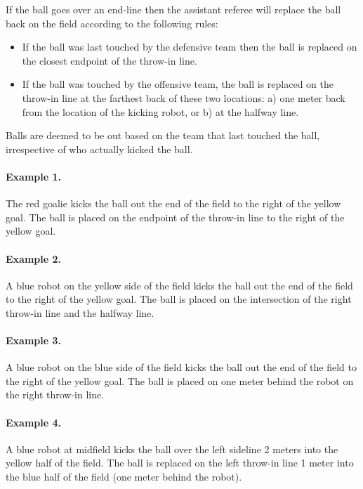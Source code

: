 \documentclass[12pt]{article}
\begin{document}
If the ball goes over an end-line then the assistant referee will replace the ball back on the field according to the following rules:

\begin{itemize}

\item If the ball was last touched by the defensive team then the ball is replaced on the closest endpoint of the throw-in line.

\item If the ball was touched by the offensive team, the ball is replaced on
the throw-in line at the farthest back of these two locations: a) one
meter back from the location of the kicking robot, or b) at the halfway
line.

\end{itemize}

Balls are deemed to be out based on the team that last touched the ball, irrespective of who actually kicked the ball.

\paragraph{Example 1.} The red goalie kicks the ball out the end of the field to the right of the yellow goal. The ball is placed on the endpoint of the throw-in line to the right of the yellow goal.

\paragraph{Example 2.} A blue robot on the yellow side of the field kicks the ball out the end of the field to the right of the yellow goal. The ball is placed on the intersection of the right throw-in line and the halfway line.

\paragraph{Example 3.} A blue robot on the blue side of the field kicks the ball out the end of the field to the right of the yellow goal. The ball is placed on one meter behind the robot on the right throw-in line.

\paragraph{Example 4.} A blue robot at midfield kicks the ball over the left sideline 2 meters into the yellow half of the field. The ball is replaced on the left throw-in line 1 meter into the blue half of the field (one meter behind the robot).
\end{document}
